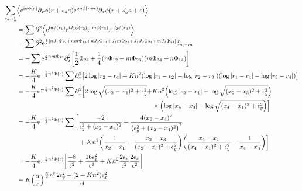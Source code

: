 \documentclass[english, parskip=full]{scrartcl}
\begin{document}
\begin{align}
\sum_{s_a,s_a'} &\bra*{\powe{\i n\phi(r)} \partial_x\phi(r+s_aa) \powe{\i m\phi(r+\epsilon)} \partial_x\phi(r+s_a'a+\epsilon)}\\
&= \sum \partial^2 \bra*{\powe{\i n\phi(r_1)}\powe{\i J_1\phi(r_2)}\powe{\i m\phi(r_3)}\powe{\i J_2\phi(r_4)}}\\
&= \sum \partial^2 \powe{\frac{1}{2} \klb*{nJ_1 \Phi_{12} + nm \Phi_{13} + nJ_2 \Phi_{14} + J_1m\Phi_{23} + J_1J_2 \Phi_{24} + mJ_2 \Phi_{34}}} \delta_{n,-m}\\
&= -\sum \powe{\frac{1}{2} nm \Phi_{13}} \partial_x^2 \klb*{\frac{1}{2}\Phi_{24} +  \frac{1}{4}\kla*{n\Phi_{12} + m\Phi_{23}} \kla*{m\Phi_{34} + n\Phi_{14}}}\\
&= -\frac{K}{4} \powe{-\frac{1}{2}n^2 \Phi(\epsilon)} \sum \partial_x^2 \klb*{2\log |r_2-r_4| + Kn^2 \kla*{\log |r_1-r_2| - \log |r_2-r_3|} \kla*{\log|r_1-r_4| - \log|r_3-r_4|}}\\
&= -\frac{K}{4} \powe{-\frac{1}{2}n^2 \Phi(\epsilon)} \sum \partial_x^2 \bsplit{\klb[\Big]{2\log \sqrt{(x_2-x_4)^2 + \epsilon_y^2} + &Kn^2 \kla*{\log |x_2-x_1| - \log \sqrt{(x_2-x_3)^2 + \epsilon_y^2}} \\
&\times \kla*{\log|x_4-x_3| - \log \sqrt{(x_4-x_1)^2 + \epsilon_y^2}}}}\\
&= -\frac{K}{4} \powe{-\frac{1}{2}n^2 \Phi(\epsilon)} \sum \bsplit{\klb[\bigg]{ &\frac{-2}{\epsilon_y^2 + (x_2-x_4)^2} + \frac{4(x_2 - x_4)^2}{\kla*{\epsilon_y^2 + (x_2 - x_4)^2}^2} \\
& + Kn^2 \kla*{\frac{1}{x_2-x_1} -\frac{x_2-x_3}{(x_2-x_3)^2 + \epsilon_y^2}} \kla*{\frac{x_4-x_1}{(x_4-x_1)^2 + \epsilon_y^2} - \frac{1}{x_4-x_3}}}}\\
&= -\frac{K}{4} \powe{-\frac{1}{2}n^2 \Phi(\epsilon)} \klb*{\frac{-8}{\epsilon^2} + \frac{16\epsilon_x^2}{\epsilon^4} + Kn^2 \frac{2\epsilon_x}{\epsilon^2} \frac{2\epsilon_x}{\epsilon^2}} \\
&= K \kla*{\frac{\alpha}{\epsilon}}^{\frac{K}{2}n^2} \frac{2\epsilon_y^2 - (2+Kn^2)\epsilon_x^2}{\epsilon^4}.
\end{align}
\end{document}
